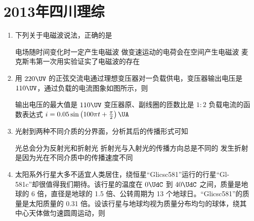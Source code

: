 \documentclass[\gkver]{gaokaozhenti}
\begin{document}
\chapter{2013年四川理综}

\begin{enumerate}
\item
下列关于电磁波说法，正确的是

{电场随时间变化时一定产生电磁波}
{做变速运动的电荷会在空间产生电磁波}
{麦克斯韦第一次用实验证实了电磁波的存在}


\item
用 $220\UV$ 的正弦交流电通过理想变压器对一负载供电，变压器输出电压是 $110\UV$，通过负载的电流图象如图所示，则


{输出电压的最大值是 $110\UV$}
{变压器原、副线圈的匝数比是 $1:2$}
{负载电流的函数表达式 $i=0.05\sin\left(100\pi t+\frac{\pi}{2}\right)\UA$}


\item
光射到两种不同介质的分界面，分析其后的传播形式可知

{光总会分为反射光和折射光}
{折射光与入射光的传播方向总是不同的}
{发生折射是因为光在不同介质中的传播速度不同}


\item
太阳系外行星大多不适宜人类居住，绕恒星“Glicsc581”运行的行星“Gl-581c”却很值得我们期待。该行星的温度在 $0\UdC$ 到 $40\UdC$ 之间，质量是地球的 6 倍，直径是地球的 1.5 倍、公转周期为 13 个地球日。“Glicsc581”的质量是太阳质量的 0.31 倍。设该行星与地球均视为质量分布均匀的球体，绕其中心天体做匀速圆周运动，则


\end{enumerate}
\end{document}
